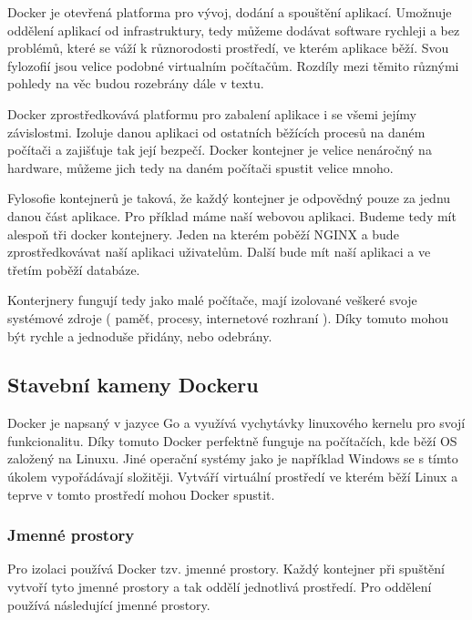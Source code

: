 \documentclass[thesis=B,czech]{FITthesis}[2019/12/23]
\begin{document}
Docker je otevřená platforma pro vývoj, dodání a spouštění aplikací. Umožnuje oddělení aplikací od infrastruktury, tedy můžeme dodávat software rychleji a bez problémů, které se váží k různorodosti prostředí, ve kterém aplikace běží. Svou fylozofií jsou velice podobné virtualním počítačům. Rozdíly mezi těmito různými pohledy na věc budou rozebrány dále v textu. 

Docker zprostředkovává platformu pro zabalení aplikace i se všemi jejímy závislostmi. Izoluje danou aplikaci od ostatních běžících procesů na daném počítači a zajišťuje tak její bezpečí. Docker kontejner je velice nenáročný na hardware, můžeme jich tedy na daném počítači spustit velice mnoho.  

Fylosofie kontejnerů je taková, že každý kontejner je odpovědný pouze za jednu danou část aplikace. Pro příklad máme naší webovou aplikaci. Budeme tedy mít alespoň tři docker kontejnery. Jeden na kterém poběží NGINX a bude zprostředkovávat naší aplikaci uživatelům. Další bude mít naší aplikaci a ve třetím poběží databáze. 

Konterjnery fungují tedy jako malé počítače, mají izolované veškeré svoje systémové zdroje ( paměť, procesy, internetové rozhraní ). Díky tomuto mohou být rychle a jednoduše přidány, nebo odebrány.  

\subsection{Stavební kameny Dockeru}

Docker je napsaný v jazyce Go a využívá vychytávky linuxového kernelu pro svojí funkcionalitu. Díky tomuto Docker perfektně funguje na počítačích, kde běží OS založený na Linuxu. Jiné operační systémy jako je například Windows se s tímto úkolem vypořádávají složitěji. Vytváří virtuální prostředí ve kterém běží Linux a teprve v tomto prostředí mohou Docker spustit.

\subsubsection{Jmenné prostory}

Pro izolaci používá Docker tzv. jmenné prostory. Každý kontejner při spuštění vytvoří tyto jmenné prostory a tak oddělí jednotlivá prostředí. Pro oddělení používá následující jmenné prostory.
\end{document}
